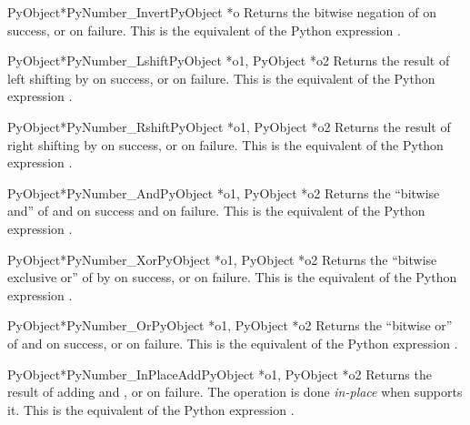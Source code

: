 \documentclass{manual}
\begin{document}
\begin{cfuncdesc}{PyObject*}{PyNumber_Invert}{PyObject *o}
Returns the bitwise negation of  on success, or \NULL{} on
failure.  This is the equivalent of the Python expression
.
\end{cfuncdesc}


\begin{cfuncdesc}{PyObject*}{PyNumber_Lshift}{PyObject *o1, PyObject *o2}
Returns the result of left shifting  by  on success,
or \NULL{} on failure.  This is the equivalent of the Python
expression .
\end{cfuncdesc}


\begin{cfuncdesc}{PyObject*}{PyNumber_Rshift}{PyObject *o1, PyObject *o2}
Returns the result of right shifting  by  on success,
or \NULL{} on failure.  This is the equivalent of the Python
expression .
\end{cfuncdesc}


\begin{cfuncdesc}{PyObject*}{PyNumber_And}{PyObject *o1, PyObject *o2}
Returns the ``bitwise and'' of  and  on success and
\NULL{} on failure. This is the equivalent of the Python expression
.
\end{cfuncdesc}


\begin{cfuncdesc}{PyObject*}{PyNumber_Xor}{PyObject *o1, PyObject *o2}
Returns the ``bitwise exclusive or'' of  by  on success,
or \NULL{} on failure.  This is the equivalent of the Python
expression .
\end{cfuncdesc}

\begin{cfuncdesc}{PyObject*}{PyNumber_Or}{PyObject *o1, PyObject *o2}
Returns the ``bitwise or'' of  and  on success, or
\NULL{} on failure.  This is the equivalent of the Python expression
.
\end{cfuncdesc}


\begin{cfuncdesc}{PyObject*}{PyNumber_InPlaceAdd}{PyObject *o1, PyObject *o2}
Returns the result of adding  and , or \NULL{} on failure. 
The operation is done \emph{in-place} when  supports it.  This is the
equivalent of the Python expression .
\end{cfuncdesc}
\end{document}
